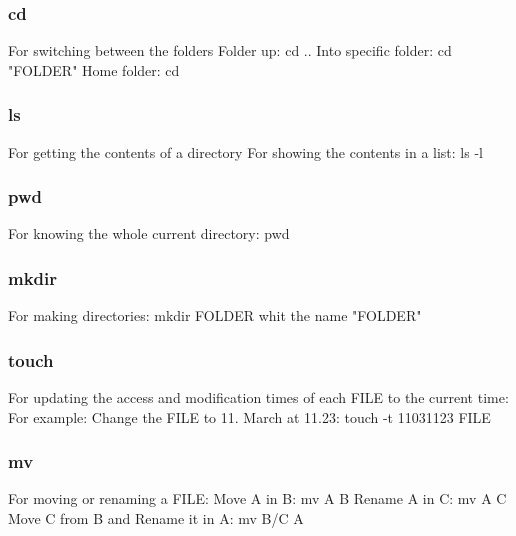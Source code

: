 \documentclass[10pt,a4paper]{scrartcl}
\begin{document}
\begin{description}
\subsubsection{cd}
\begin{terminalcode}
For switching between the folders
Folder up: cd ..
Into specific folder: cd "FOLDER"
Home folder: cd ~
\end{terminalcode}

\subsubsection{ls}
\begin{terminalcode}
For getting the contents of a directory
For showing the contents in a list: ls -l
\end{terminalcode}

\subsubsection{pwd}
\begin{terminalcode}
For knowing the whole current directory: pwd
\end{terminalcode}

\subsubsection{mkdir}
\begin{terminalcode}
For making directories: mkdir FOLDER  whit the name "FOLDER"
\end{terminalcode}

\subsubsection{touch}
\begin{terminalcode}
For updating the access and modification times of each FILE to the current time:
For example: Change the FILE to 11. March at 11.23: touch -t 11031123 FILE
\end{terminalcode}

\subsubsection{mv}
\begin{terminalcode}
For moving or renaming a FILE:
Move A in B: mv A B
Rename A in C: mv A C
Move C from B and Rename it in A: mv B/C A
\end{terminalcode}


\end{description}
\end{document}
